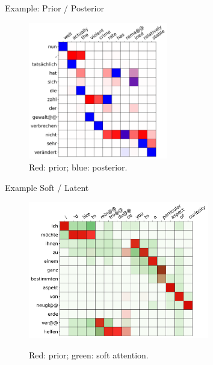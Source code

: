 \begin{frame}{Example: Prior / Posterior }
\begin{figure}[t]
  \centering
  \includegraphics[height=6cm]{img/var-attn/2531p-q-attn}
  \caption{\label{fig:attn} Red: prior; blue: posterior.}
  \label{fig:pq}
\end{figure}
\end{frame}
\begin{frame}{Example Soft / Latent}
\begin{figure}[t]
  \centering
  \includegraphics[height=6cm]{img/var-attn/2509svattn}
  \label{fig:pq:b}
  \caption{\label{fig:attn} Red: prior; green: soft attention.}
  \label{fig:pq}
\end{figure}
\end{frame}



